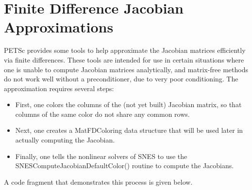 \section{Finite Difference Jacobian Approximations}
\label{sec_fdmatrix}

PETSc provides some tools to help approximate the Jacobian matrices efficiently via
finite differences.  These tools are intended for use in certain situations where
one is unable to compute Jacobian matrices analytically, and matrix-free methods
do not work well without a preconditioner, due to very poor conditioning.
The approximation requires several steps:
\begin{itemize}
\item First, one colors the columns of the (not yet built) Jacobian matrix, so that
      columns of the same color do not share any common rows.
\item Next, one creates a MatFDColoring data structure that will be used later in
      actually computing the Jacobian.
\item Finally, one tells the nonlinear solvers of SNES to use the
      SNESComputeJacobianDefaultColor()
      routine to compute the Jacobians.
\end{itemize}
A code fragment that demonstrates this process is given below.
